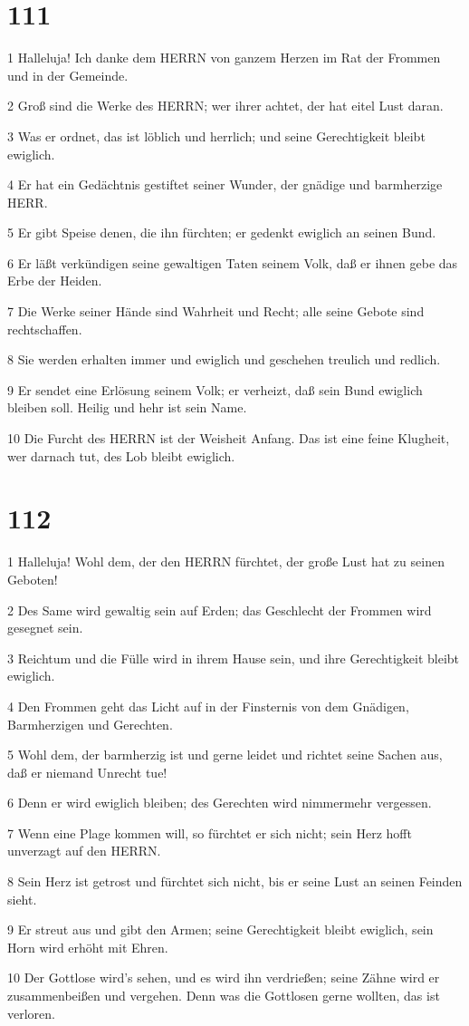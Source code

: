 \chapter{111}

\par 1 Halleluja! Ich danke dem HERRN von ganzem Herzen im Rat der Frommen und in der Gemeinde.
\par 2 Groß sind die Werke des HERRN; wer ihrer achtet, der hat eitel Lust daran.
\par 3 Was er ordnet, das ist löblich und herrlich; und seine Gerechtigkeit bleibt ewiglich.
\par 4 Er hat ein Gedächtnis gestiftet seiner Wunder, der gnädige und barmherzige HERR.
\par 5 Er gibt Speise denen, die ihn fürchten; er gedenkt ewiglich an seinen Bund.
\par 6 Er läßt verkündigen seine gewaltigen Taten seinem Volk, daß er ihnen gebe das Erbe der Heiden.
\par 7 Die Werke seiner Hände sind Wahrheit und Recht; alle seine Gebote sind rechtschaffen.
\par 8 Sie werden erhalten immer und ewiglich und geschehen treulich und redlich.
\par 9 Er sendet eine Erlösung seinem Volk; er verheizt, daß sein Bund ewiglich bleiben soll. Heilig und hehr ist sein Name.
\par 10 Die Furcht des HERRN ist der Weisheit Anfang. Das ist eine feine Klugheit, wer darnach tut, des Lob bleibt ewiglich.

\chapter{112}

\par 1 Halleluja! Wohl dem, der den HERRN fürchtet, der große Lust hat zu seinen Geboten!
\par 2 Des Same wird gewaltig sein auf Erden; das Geschlecht der Frommen wird gesegnet sein.
\par 3 Reichtum und die Fülle wird in ihrem Hause sein, und ihre Gerechtigkeit bleibt ewiglich.
\par 4 Den Frommen geht das Licht auf in der Finsternis von dem Gnädigen, Barmherzigen und Gerechten.
\par 5 Wohl dem, der barmherzig ist und gerne leidet und richtet seine Sachen aus, daß er niemand Unrecht tue!
\par 6 Denn er wird ewiglich bleiben; des Gerechten wird nimmermehr vergessen.
\par 7 Wenn eine Plage kommen will, so fürchtet er sich nicht; sein Herz hofft unverzagt auf den HERRN.
\par 8 Sein Herz ist getrost und fürchtet sich nicht, bis er seine Lust an seinen Feinden sieht.
\par 9 Er streut aus und gibt den Armen; seine Gerechtigkeit bleibt ewiglich, sein Horn wird erhöht mit Ehren.
\par 10 Der Gottlose wird's sehen, und es wird ihn verdrießen; seine Zähne wird er zusammenbeißen und vergehen. Denn was die Gottlosen gerne wollten, das ist verloren.

